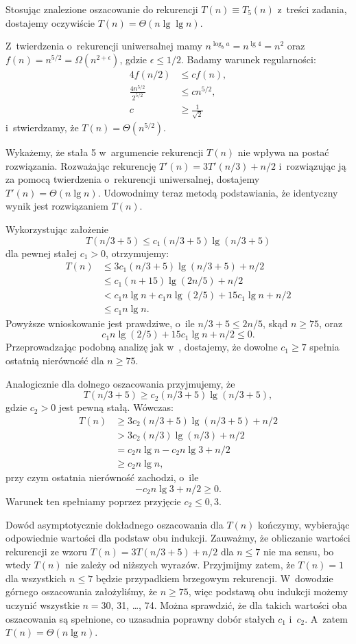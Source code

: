 Stosując znalezione oszacowanie do rekurencji $T(n)\equiv T_5(n)$ z~treści zadania, dostajemy oczywiście $T(n)=\Theta(n\lg\lg n)$.

\subproblem %
Z~twierdzenia o~rekurencji uniwersalnej mamy $n^{\log_ba}=n^{\lg4}=n^2$ oraz $f(n)=n^{5/2}=\Omega(n^{2+\epsilon})$, gdzie $\epsilon\le1/2$.
Badamy warunek regularności:
\begin{align*}
	4f(n/2) &\le cf(n), \\
	\frac{4n^{5/2}}{2^{5/2}} &\le cn^{5/2}, \\
	c &\ge \frac{1}{\sqrt{2}}
\end{align*}
i~stwierdzamy, że $T(n)=\Theta(n^{5/2})$.

\subproblem %
Wykażemy, że stała 5 w~argumencie rekurencji $T(n)$ nie wpływa na postać rozwiązania.
Rozważając rekurencję $T'(n)=3T'(n/3)+n/2$ i~rozwiązując ją za pomocą twierdzenia o~rekurencji uniwersalnej, dostajemy $T'(n)=\Theta(n\lg n)$.
Udowodnimy teraz metodą podstawiania, że identyczny wynik jest rozwiązaniem $T(n)$.

Wykorzystując założenie
\[
	T(n/3+5) \le c_1(n/3+5)\lg(n/3+5)
\]
dla pewnej stałej $c_1>0$, otrzymujemy:
\begin{align*}
	T(n) &\le 3c_1(n/3+5)\lg(n/3+5)+n/2 \\
	&\le c_1(n+15)\lg(2n/5)+n/2 \\
	&< c_1n\lg n+c_1n\lg(2/5)+15c_1\!\lg n+n/2 \\
	&\le c_1n\lg n.
\end{align*}
Powyższe wnioskowanie jest prawdziwe, o~ile $n/3+5\le2n/5$, skąd $n\ge75$, oraz
\[
	c_1n\lg(2/5)+15c_1\!\lg n+n/2 \le 0.
\]
Przeprowadzając podobną analizę jak w~, dostajemy, że dowolne $c_1\ge7$ spełnia ostatnią nierówność dla $n\ge75$.

Analogicznie dla dolnego oszacowania przyjmujemy, że
\[
	T(n/3+5) \ge c_2(n/3+5)\lg(n/3+5),
\]
gdzie $c_2>0$ jest pewną stałą.
Wówczas:
\begin{align*}
	T(n) &\ge 3c_2(n/3+5)\lg(n/3+5)+n/2 \\
	&> 3c_2(n/3)\lg(n/3)+n/2 \\
	&= c_2n\lg n-c_2n\lg3+n/2 \\
	&\ge c_2n\lg n,
\end{align*}
przy czym ostatnia nierówność zachodzi, o~ile
\[
	-c_2n\lg3+n/2 \ge 0.
\]
Warunek ten spełniamy poprzez przyjęcie $c_2\le0{,}3$.

Dowód asymptotycznie dokładnego oszacowania dla $T(n)$ kończymy, wybierając odpowiednie wartości dla podstaw obu indukcji.
Zauważmy, że obliczanie wartości rekurencji ze wzoru $T(n)=3T(n/3+5)+n/2$ dla $n\le7$ nie ma sensu, bo wtedy $T(n)$ nie zależy od niższych wyrazów.
Przyjmijmy zatem, że $T(n)=1$ dla wszystkich $n\le7$ będzie przypadkiem brzegowym rekurencji.
W~dowodzie górnego oszacowania założyliśmy, że $n\ge75$, więc podstawą obu indukcji możemy uczynić wszystkie $n=30$, 31, \dots, 74.
Można sprawdzić, że dla takich wartości oba oszacowania są spełnione, co uzasadnia poprawny dobór stałych $c_1$ i~$c_2$.
A~zatem $T(n)=\Theta(n\lg n)$.

